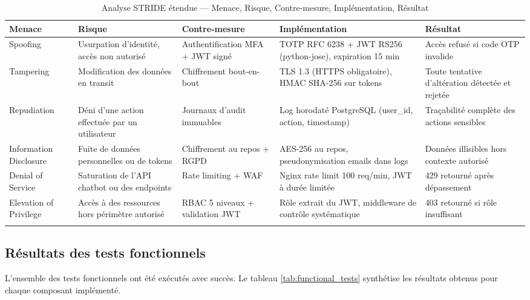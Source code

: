 \begin{longtable}{|m{2.5cm}|m{2.5cm}|m{2.5cm}|m{3.5cm}|m{2cm}|}
\hline
\textbf{Menace} & \textbf{Risque} & \textbf{Contre-mesure} & \textbf{Implémentation} & \textbf{Résultat} \\
\hline
\endhead
\endfoot
\endlastfoot
\hline
Spoofing & Usurpation d'identité, accès non autorisé & Authentification MFA + JWT signé & TOTP RFC 6238 + JWT RS256 (python-jose), expiration 15 min & Accès refusé si code OTP invalide \\
\hline
Tampering & Modification des données en transit & Chiffrement bout-en-bout & TLS 1.3 (HTTPS obligatoire), HMAC SHA-256 sur tokens & Toute tentative d'altération détectée et rejetée \\
\hline
Repudiation & Déni d'une action effectuée par un utilisateur & Journaux d'audit immuables & Log horodaté PostgreSQL (user\_id, action, timestamp) & Traçabilité complète des actions sensibles \\
\hline
Information Disclosure & Fuite de données personnelles ou de tokens & Chiffrement au repos + RGPD & AES-256 au repos, pseudonymisation emails dans logs & Données illisibles hors contexte autorisé \\
\hline
Denial of Service & Saturation de l'API chatbot ou des endpoints & Rate limiting + WAF & Nginx rate limit 100 req/min, JWT à durée limitée & 429 retourné après dépassement \\
\hline
Elevation of Privilege & Accès à des ressources hors périmètre autorisé & RBAC 5 niveaux + validation JWT & Rôle extrait du JWT, middleware de contrôle systématique & 403 retourné si rôle insuffisant \\
\hline
\captionsetup{justification=centering,margin=2cm}
\caption{Analyse STRIDE étendue — Menace, Risque, Contre-mesure, Implémentation, Résultat}
\label{tab:stride_impl}
\end{longtable}

\subsection{Résultats des tests fonctionnels}
L'ensemble des tests fonctionnels ont été exécutés avec succès. Le tableau \ref{tab:functional_tests} synthétise les résultats obtenus pour chaque composant implémenté.


